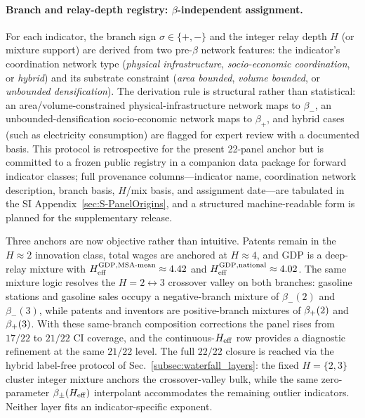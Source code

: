\paragraph{Branch and relay-depth registry: $\beta$-independent assignment.}
For each indicator, the branch sign $\sigma\in\{+,-\}$ and the integer
relay depth $H$ (or mixture support) are derived from two pre-$\beta$
network features: the indicator's coordination network type
(\textit{physical infrastructure}, \textit{socio-economic coordination},
or \textit{hybrid}) and its substrate constraint (\textit{area bounded},
\textit{volume bounded}, or \textit{unbounded densification}).
The derivation rule is structural rather than statistical: an
area/volume-constrained physical-infrastructure network maps to
$\beta_{-}$, an unbounded-densification socio-economic network maps to
$\beta_{+}$, and hybrid cases (such as
electricity consumption) are flagged for expert review with a
documented basis. This protocol is retrospective for the present
22-panel anchor but is committed to a frozen public registry in a
companion data package for forward indicator classes; full provenance
columns---indicator name, coordination network description, branch
basis, $H$/mix basis, and assignment date---are tabulated in the SI
Appendix~\ref{sec:S-PanelOrigins}, and a structured machine-readable
form is planned for the supplementary release.

Three anchors are now objective rather than intuitive. Patents remain in the
$H\approx 2$ innovation class, total wages are anchored at $H\approx 4$,
and GDP is a deep-relay mixture with
$H_{\mathrm{eff}}^{\mathrm{GDP,MSA\text{-}mean}}\approx 4.42$ and
$H_{\mathrm{eff}}^{\mathrm{GDP,national}}\approx 4.02$. The same mixture logic resolves
the $H=2\leftrightarrow 3$ crossover valley on both branches: gasoline
stations and gasoline sales occupy a negative-branch mixture of
$\beta_{-}(2)$ and $\beta_{-}(3)$, while patents and inventors are
positive-branch mixtures of $\beta_+\!\left(2\right)$ and $\beta_+\!\left(3\right)$. With these
same-branch composition corrections the panel rises from $17/22$ to
$21/22$ CI coverage, and the continuous-$H_{\mathrm{eff}}$ row provides a
diagnostic refinement at the same $21/22$ level.  The full $22/22$
closure is reached via the hybrid label-free protocol of
Sec.~\ref{subsec:waterfall_layers}: the fixed $H{=}\{2,3\}$ cluster
integer mixture anchors the crossover-valley bulk, while the same
zero-parameter $\beta_{\pm}(H_{\mathrm{eff}})$ interpolant accommodates the
remaining outlier indicators. Neither layer fits an indicator-specific
exponent.

